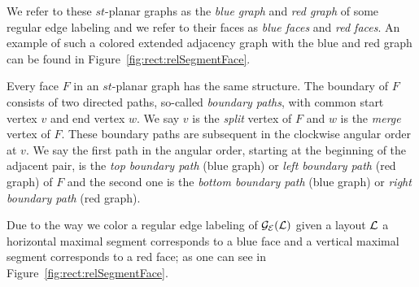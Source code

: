     We refer to these $st$-planar graphs as the \emph{blue graph} and \emph{red graph} of some regular edge labeling and we refer to their faces as \emph{blue faces} and \emph{red faces}. An example of such a colored extended adjacency graph with the blue and red graph can be found in Figure~\ref{fig:rect:relSegmentFace}.

    Every face $F$ in an $st$-planar graph has the same structure. The boundary of $F$ consists of two directed paths, so-called \emph{boundary paths}, with common start vertex $v$ and end vertex $w$. We say $v$ is the \emph{split} vertex of $F$ and $w$ is the \emph{merge} vertex of $F$.
    These boundary paths are subsequent in the clockwise angular order at $v$. We say the first path in the angular order, starting at the beginning of the adjacent pair, is the \emph{top boundary path} (blue graph) or \emph{left boundary path} (red graph) of $F$ and the second one is the \emph{bottom boundary path} (blue graph) or \emph{right boundary path} (red graph).


    Due to the way we color a regular edge labeling of $\mathcal{G}_{\mathcal{E}}(\mathcal{L})$ given a layout $\mathcal{L}$ a horizontal maximal segment corresponds to a blue face and a vertical maximal segment corresponds to a red face; as one can see in Figure~\ref{fig:rect:relSegmentFace}.

